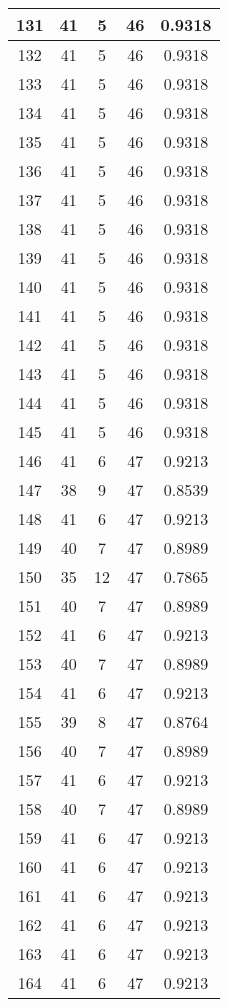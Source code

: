 \documentclass[letterpaper, 12pt]{article}
\begin{document}
\begin{longtable}{|c|c|c|c|c|}
\hline
131 & 41 & 5 & 46 & 0.9318 \\
\hline
132 & 41 & 5 & 46 & 0.9318 \\
\hline
133 & 41 & 5 & 46 & 0.9318 \\
\hline
134 & 41 & 5 & 46 & 0.9318 \\
\hline
135 & 41 & 5 & 46 & 0.9318 \\
\hline
136 & 41 & 5 & 46 & 0.9318 \\
\hline
137 & 41 & 5 & 46 & 0.9318 \\
\hline
138 & 41 & 5 & 46 & 0.9318 \\
\hline
139 & 41 & 5 & 46 & 0.9318 \\
\hline
140 & 41 & 5 & 46 & 0.9318 \\
\hline
141 & 41 & 5 & 46 & 0.9318 \\
\hline
142 & 41 & 5 & 46 & 0.9318 \\
\hline
143 & 41 & 5 & 46 & 0.9318 \\
\hline
144 & 41 & 5 & 46 & 0.9318 \\
\hline
145 & 41 & 5 & 46 & 0.9318 \\
\hline
146 & 41 & 6 & 47 & 0.9213 \\
\hline
147 & 38 & 9 & 47 & 0.8539 \\
\hline
148 & 41 & 6 & 47 & 0.9213 \\
\hline
149 & 40 & 7 & 47 & 0.8989 \\
\hline
150 & 35 & 12 & 47 & 0.7865 \\
\hline
151 & 40 & 7 & 47 & 0.8989 \\
\hline
152 & 41 & 6 & 47 & 0.9213 \\
\hline
153 & 40 & 7 & 47 & 0.8989 \\
\hline
154 & 41 & 6 & 47 & 0.9213 \\
\hline
155 & 39 & 8 & 47 & 0.8764 \\
\hline
156 & 40 & 7 & 47 & 0.8989 \\
\hline
157 & 41 & 6 & 47 & 0.9213 \\
\hline
158 & 40 & 7 & 47 & 0.8989 \\
\hline
159 & 41 & 6 & 47 & 0.9213 \\
\hline
160 & 41 & 6 & 47 & 0.9213 \\
\hline
161 & 41 & 6 & 47 & 0.9213 \\
\hline
162 & 41 & 6 & 47 & 0.9213 \\
\hline
163 & 41 & 6 & 47 & 0.9213 \\
\hline
164 & 41 & 6 & 47 & 0.9213 \\

\end{longtable}
\end{document}

